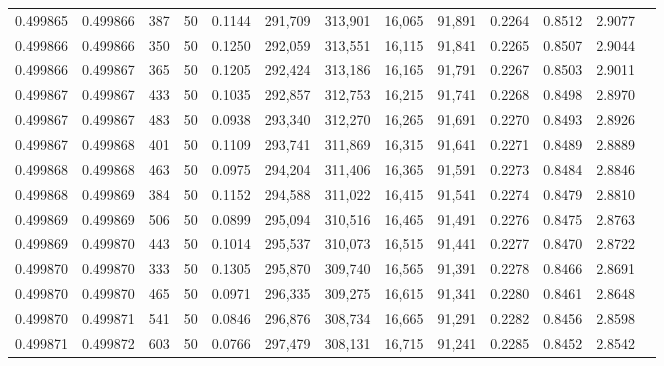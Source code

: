 \begin{tabular}{rrrrrrrrrrrrr}
0.499865 & 0.499866 &   387 &  50 &                                     0.1144 & 291,709 & 313,901 &  16,065 &  91,891 & 0.2264 & 0.8512 & 2.9077 \\
0.499866 & 0.499866 &   350 &  50 &                                     0.1250 & 292,059 & 313,551 &  16,115 &  91,841 & 0.2265 & 0.8507 & 2.9044 \\
0.499866 & 0.499867 &   365 &  50 &                                     0.1205 & 292,424 & 313,186 &  16,165 &  91,791 & 0.2267 & 0.8503 & 2.9011 \\
0.499867 & 0.499867 &   433 &  50 &                                     0.1035 & 292,857 & 312,753 &  16,215 &  91,741 & 0.2268 & 0.8498 & 2.8970 \\
0.499867 & 0.499867 &   483 &  50 &                                     0.0938 & 293,340 & 312,270 &  16,265 &  91,691 & 0.2270 & 0.8493 & 2.8926 \\
0.499867 & 0.499868 &   401 &  50 &                                     0.1109 & 293,741 & 311,869 &  16,315 &  91,641 & 0.2271 & 0.8489 & 2.8889 \\
0.499868 & 0.499868 &   463 &  50 &                                     0.0975 & 294,204 & 311,406 &  16,365 &  91,591 & 0.2273 & 0.8484 & 2.8846 \\
0.499868 & 0.499869 &   384 &  50 &                                     0.1152 & 294,588 & 311,022 &  16,415 &  91,541 & 0.2274 & 0.8479 & 2.8810 \\
0.499869 & 0.499869 &   506 &  50 &                                     0.0899 & 295,094 & 310,516 &  16,465 &  91,491 & 0.2276 & 0.8475 & 2.8763 \\
0.499869 & 0.499870 &   443 &  50 &                                     0.1014 & 295,537 & 310,073 &  16,515 &  91,441 & 0.2277 & 0.8470 & 2.8722 \\
0.499870 & 0.499870 &   333 &  50 &                                     0.1305 & 295,870 & 309,740 &  16,565 &  91,391 & 0.2278 & 0.8466 & 2.8691 \\
0.499870 & 0.499870 &   465 &  50 &                                     0.0971 & 296,335 & 309,275 &  16,615 &  91,341 & 0.2280 & 0.8461 & 2.8648 \\
0.499870 & 0.499871 &   541 &  50 &                                     0.0846 & 296,876 & 308,734 &  16,665 &  91,291 & 0.2282 & 0.8456 & 2.8598 \\
0.499871 & 0.499872 &   603 &  50 &                                     0.0766 & 297,479 & 308,131 &  16,715 &  91,241 & 0.2285 & 0.8452 & 2.8542 \\

\end{tabular}
